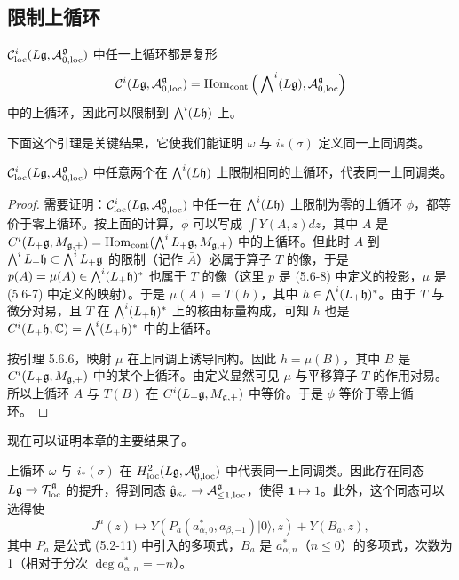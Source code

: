 
\subsection{限制上循环}

$\mathcal{C}^i_{\mathrm{loc}}(L\mathfrak{g},\mathcal{A}^{\mathfrak{g}}_{0,\mathrm{loc}})$ 中任一上循环都是复形
\[
\mathcal{C}^i(L\mathfrak{g},\mathcal{A}^{\mathfrak{g}}_{0,\mathrm{loc}}) = \operatorname{Hom}_{\mathrm{cont}}\Big(\bigwedge\nolimits^i(L\mathfrak{g}),\mathcal{A}^{\mathfrak{g}}_{0,\mathrm{loc}}\Big)
\]
中的上循环，因此可以限制到 $\bigwedge^i(L\mathfrak{h})$ 上。

下面这个引理是关键结果，它使我们能证明 $\omega$ 与 $i_*(\sigma)$ 定义同一上同调类。

\begin{lemma}
$\mathcal{C}^i_{\mathrm{loc}}(L\mathfrak{g},\mathcal{A}^{\mathfrak{g}}_{0,\mathrm{loc}})$ 中任意两个在 $\bigwedge^i(L\mathfrak{h})$ 上限制相同的上循环，代表同一上同调类。
\end{lemma}

\begin{proof}
需要证明：$\mathcal{C}^i_{\mathrm{loc}}(L\mathfrak{g},\mathcal{A}^{\mathfrak{g}}_{0,\mathrm{loc}})$ 中任一在 $\bigwedge^i(L\mathfrak{h})$ 上限制为零的上循环 $\phi$，都等价于零上循环。按上面的计算，$\phi$ 可以写成 $\int Y(A,z)dz$，其中 $A$ 是 $C^i(L_+\mathfrak{g},M_{\mathfrak{g},+}) = \operatorname{Hom}_{\mathrm{cont}}(\bigwedge^i L_+\mathfrak{g},M_{\mathfrak{g},+})$ 中的上循环。但此时 $A$ 到 $\bigwedge^i L_+\mathfrak{h}\subset\bigwedge^i L_+\mathfrak{g}$ 的限制（记作 $\bar A$）必属于算子 $T$ 的像，于是 $p(A) = \mu(A)\in\bigwedge^i(L_+\mathfrak{h})^*$ 也属于 $T$ 的像（这里 $p$ 是 (5.6-8) 中定义的投影，$\mu$ 是 (5.6-7) 中定义的映射）。于是 $\mu(A) = T(h)$，其中 $h\in\bigwedge^i(L_+\mathfrak{h})^*$。由于 $T$ 与微分对易，且 $T$ 在 $\bigwedge^i(L_+\mathfrak{h})^*$ 上的核由标量构成，可知 $h$ 也是 $C^i(L_+\mathfrak{h},\mathbb{C}) = \bigwedge^i(L_+\mathfrak{h})^*$ 中的上循环。

按引理 5.6.6，映射 $\mu$ 在上同调上诱导同构。因此 $h = \mu(B)$，其中 $B$ 是 $C^i(L_+\mathfrak{g},M_{\mathfrak{g},+})$ 中的某个上循环。由定义显然可见 $\mu$ 与平移算子 $T$ 的作用对易。所以上循环 $A$ 与 $T(B)$ 在 $C^i(L_+\mathfrak{g},M_{\mathfrak{g},+})$ 中等价。于是 $\phi$ 等价于零上循环。
\end{proof}

现在可以证明本章的主要结果了。

\begin{theorem}
上循环 $\omega$ 与 $i_*(\sigma)$ 在 $H^2_{\mathrm{loc}}(L\mathfrak{g},\mathcal{A}^{\mathfrak{g}}_{0,\mathrm{loc}})$ 中代表同一上同调类。因此存在同态 $L\mathfrak{g}\to\mathcal{T}^{\mathfrak{g}}_{\mathrm{loc}}$ 的提升，得到同态 $\hat{\mathfrak{g}}_{\kappa_c}\to\mathcal{A}^{\mathfrak{g}}_{\le1,\mathrm{loc}}$，使得 $\mathbf{1}\mapsto 1$。此外，这个同态可以选得使
\begin{equation}
J^a(z)\mapsto Y(P_a(a^*_{\alpha,0},a_{\beta,-1})|0\rangle,z) + Y(B_a,z),
\tag{5.6-9}
\end{equation}
其中 $P_a$ 是公式 (5.2-11) 中引入的多项式，$B_a$ 是 $a^*_{\alpha,n}$（$n\le 0$）的多项式，次数为 1（相对于分次 $\deg a^*_{\alpha,n} = -n$）。
\end{theorem}

